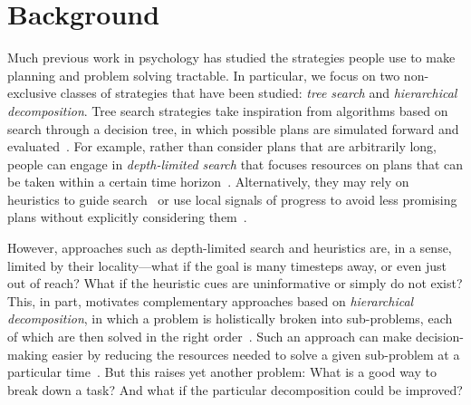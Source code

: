 \documentclass[10pt,letterpaper]{article}
\begin{document}



\section{Background}
Much previous work in psychology has studied the strategies people use to make planning and problem solving tractable. In particular, we focus on two non-exclusive classes of strategies that have been studied: \textit{tree search} and \textit{hierarchical decomposition}. Tree search strategies take inspiration from algorithms based on search through a decision tree, in which possible plans are simulated forward and evaluated~\citep{NewellSimon1972}. For example, rather than consider plans that are arbitrarily long, people can engage in \textit{depth-limited search} that focuses resources on plans that can be taken within a certain time horizon~\citep{MacGregor2001,Keramati2016,Krusche2018}. Alternatively, they may rely on heuristics to guide search~\cite[chap. 5]{Anderson1990} or use local signals of progress to avoid less promising plans without explicitly considering them~\citep{Huys2012}.

However, approaches such as depth-limited search and heuristics are, in a sense, limited by their locality---what if the goal is many timesteps away, or even just out of reach? What if the heuristic cues are uninformative or simply do not exist? This, in part, motivates complementary approaches based on \textit{hierarchical decomposition}, in which a problem is holistically broken into sub-problems, each of which are then solved in the right order~\citep{sacerdoti1974planning, botvinick2012hierarchical}. Such an approach can make decision-making easier by reducing the resources needed to solve a given sub-problem at a particular time~\citep{VanDijk2011, Maisto2015}. But this raises yet another problem: What is a good way to break down a task? And what if the particular decomposition could be improved?
\end{document}
